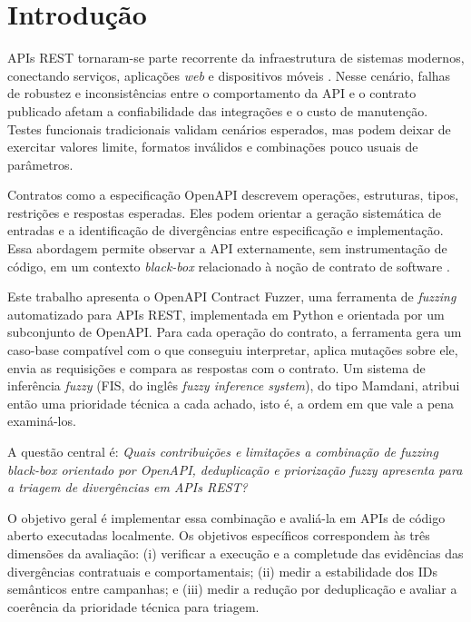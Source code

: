 \section{Introdução}

APIs REST tornaram-se parte recorrente da infraestrutura de sistemas modernos,
conectando serviços, aplicações \textit{web} e dispositivos móveis
\cite{golmohammadi2023rest}. Nesse cenário, falhas de robustez e
inconsistências entre o comportamento da API e o contrato publicado afetam a
confiabilidade das integrações e o custo de manutenção. Testes funcionais
tradicionais validam cenários esperados, mas podem deixar de exercitar valores
limite, formatos inválidos e combinações pouco usuais de parâmetros.

Contratos como a especificação OpenAPI descrevem operações, estruturas, tipos,
restrições e respostas esperadas. Eles podem orientar a geração sistemática de
entradas e a identificação de divergências entre especificação e
implementação. Essa abordagem permite observar a API externamente, sem
instrumentação de código, em um contexto \textit{black-box} relacionado à
noção de contrato de software \cite{meyer1992designbycontract}.

Este trabalho apresenta o OpenAPI Contract Fuzzer, uma ferramenta de
\textit{fuzzing} automatizado para APIs REST, implementada em Python e
orientada por um subconjunto de OpenAPI. Para cada operação do contrato, a
ferramenta gera um caso-base compatível com o que conseguiu interpretar,
aplica mutações sobre ele, envia as requisições e compara as respostas com o
contrato. Um sistema de inferência \textit{fuzzy} (FIS, do inglês
\textit{fuzzy inference system}), do tipo Mamdani, atribui então uma
prioridade técnica a cada achado, isto é, a ordem em que vale a pena
examiná-los.

A questão central é: \textit{Quais contribuições e limitações a combinação de
fuzzing black-box orientado por OpenAPI, deduplicação e priorização fuzzy
apresenta para a triagem de divergências em APIs REST?}

O objetivo geral é implementar essa combinação e avaliá-la em APIs de código
aberto executadas localmente. Os objetivos específicos correspondem às três
dimensões da avaliação: (i) verificar a execução e a completude das evidências
das divergências contratuais e comportamentais; (ii) medir a estabilidade dos
IDs semânticos entre campanhas; e (iii) medir a redução por deduplicação e
avaliar a coerência da prioridade técnica para triagem.

